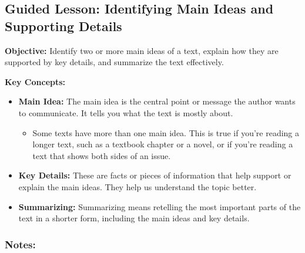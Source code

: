 \documentclass[12pt]{article}
\title{}
\date{}
\begin{document}
\subsection*{Guided Lesson: Identifying Main Ideas and Supporting Details}
\onehalfspacing

\begin{tcolorbox}[colframe=black!40, colback=gray!5, 
coltitle=black, colbacktitle=black!20, fonttitle=\bfseries\Large, 
title=Learning Objective, halign title=center, left=5pt, right=5pt, top=5pt, bottom=15pt]
\textbf{Objective:} Identify two or more main ideas of a text, explain how they are supported by key details, and summarize the text effectively.
\end{tcolorbox}

\vspace{1em}

\begin{tcolorbox}[colframe=black!60, colback=white, 
coltitle=black, colbacktitle=black!15, fonttitle=\bfseries\Large, 
title=Key Concepts and Vocabulary, halign title=center, left=10pt, right=10pt, top=10pt, bottom=15pt]
\textbf{Key Concepts:}
\begin{itemize}
    \item \textbf{Main Idea:} The main idea is the central point or message the author wants to communicate. It tells you what the text is mostly about.
    \begin{itemize}
        \item Some texts have more than one main idea. This is true if you're reading a longer text, such as a textbook chapter or a novel, or if you're reading a text that shows both sides of an issue.
    \end{itemize}
    \item \textbf{Key Details:} These are facts or pieces of information that help support or explain the main ideas. They help us understand the topic better.
    \item \textbf{Summarizing:} Summarizing means retelling the most important parts of the text in a shorter form, including the main ideas and key details.
\end{itemize}

\end{tcolorbox}

\vspace{1em}

\subsubsection*{Notes:}
\noindent \underline{\hspace{17cm}} \\[1.2cm]
\noindent \underline{\hspace{17cm}} \\[1.2cm]
\noindent \underline{\hspace{17cm}} \\[1.2cm]
\end{document}
